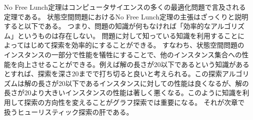 No Free Lunch定理\cite{wolpert1997no}はコンピュータサイエンスの多くの最適化問題で言及される定理である。
状態空間問題におけるNo Free Lunch定理の主張はざっくりと説明すると以下である。
つまり、問題の知識が何もなければ「効率的なアルゴリズム」というものは存在しない。
問題に対して知っている知識を利用することによってはじめて探索を効率的にすることができる。
すなわち、状態空間問題のインスタンスの一部分で性能を犠牲にすることで、他のインスタンス集合への性能を向上させることができる。例えば解の長さが20以下であるという知識があるとすれば、探索を深さ20までで打ち切ると良いと考えられる。この探索アルゴリズムは解の長さが20以下であるインスタンスに対しての性能は良くなるが、解の長さが20より大きいインスタンスの性能は著しく悪くなる。このように知識を利用して探索の方向性を変えることがグラフ探索では重要になる。
それが次章で扱うヒューリスティック探索の肝である。


